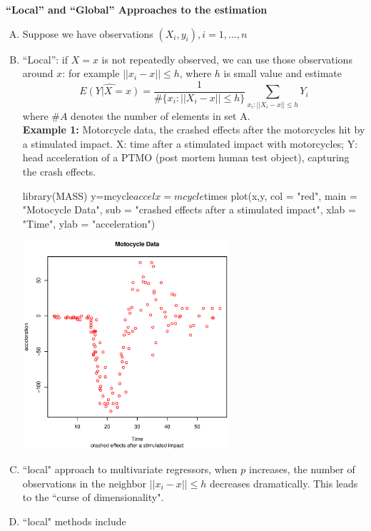 \documentclass[19pt,landscaoe]{article}
\begin{document}
\newpage
{\LARGE\centerline{\textbf{``Local'' and ``Global'' Approaches to the estimation}}}
\vskip25pt
\large
    \begin{enumerate}[(A)]

        \item Suppose we have observations $(X_i, y_i), i = 1, ..., n $
        
        \item ``Local'': if $ X=x $ is not repeatedly  observed, we can use those observations around $ x $: for example $ ||x_i - x|| \le h $, where $ h $ is small value and estimate
            $$
             \widehat{{E(Y|X=x)}} = \frac{1}{\#\{x_i: ||X_i - x|| \le h\}} \sum_{x_i: ||X_i - x|| \le h} Y_i
            $$
            where $ \#A $ denotes the number of elements in set A.\\

            {\bf Example 1:} Motorcycle data, the crashed effects after the motorcycles hit by a stimulated impact.  X: time after a stimulated impact with motorcycles; Y: head acceleration of a PTMO (post mortem human test object), capturing the crash effects.
            \begin{Schunk}
            \begin{Sinput}
library(MASS)
y=mcycle$accel
x=mcycle$times
plot(x,y, col = "red", main = "Motocycle Data", sub = 
"crashed effects after a stimulated impact", xlab = "Time",
 ylab = "acceleration")
            \end{Sinput}
        \end{Schunk}
        \begin{center}
            \includegraphics[width=0.6\textwidth,height=0.5\textwidth]{MotocycleData.eps}
        \end{center}
            \item ``local" approach to multivariate regressors, when $p $ increases, the number of observations in the neighbor  $ ||x_i - x|| \le h $ decreases dramatically. This leads to the ``curse of dimensionality".
            \item ``local" methods include
            \begin{enumerate}[(a)]
            

\end{enumerate}
\end{enumerate}
\end{document}
